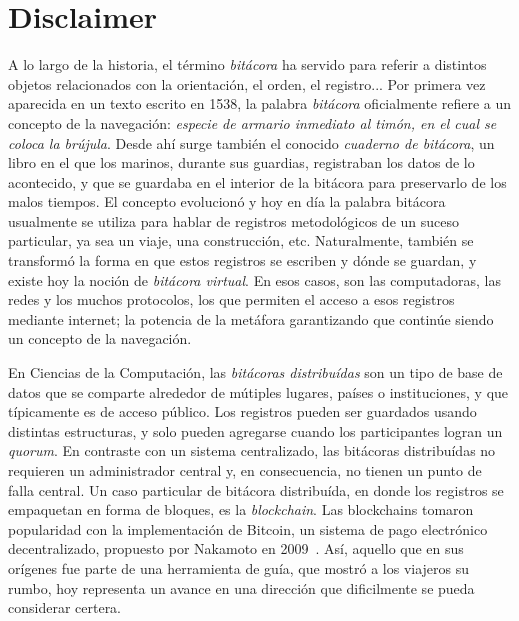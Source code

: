 \section{Disclaimer}


A lo largo de la historia, el término \textit{bitácora} ha servido para referir a
distintos objetos relacionados con la orientación, el orden, el registro... Por
primera vez aparecida en un texto escrito en 1538, la palabra \textit{bitácora}
oficialmente refiere a un concepto de la navegación: \textit{especie de armario
inmediato al timón, en el cual se coloca la brújula}. Desde ahí surge también
el conocido \textit{cuaderno de bitácora}, un libro en el que los marinos, durante
sus guardias, registraban los datos de lo acontecido, y que se guardaba en el
interior de la bitácora para preservarlo de los malos tiempos. El concepto
evolucionó y hoy en día la palabra bitácora usualmente se utiliza para hablar
de registros metodológicos de un suceso particular, ya sea un viaje, una
construcción, etc. Naturalmente, también se transformó la forma en que estos
registros se escriben y dónde se guardan, y existe hoy la noción de \textit{bitácora
virtual}. En esos casos, son las computadoras, las redes y los muchos protocolos,
los que permiten el acceso a esos registros mediante internet; la potencia de la
metáfora garantizando que continúe siendo un concepto de la navegación.
%

En Ciencias de la Computación, las \textit{bitácoras distribuídas} son un tipo de
base de datos que se comparte
alrededor de mútiples lugares, países o instituciones, y que típicamente es de
acceso público. Los registros pueden ser guardados usando distintas estructuras,
y solo pueden agregarse cuando los participantes logran un \textit{quorum}. En
contraste con un sistema centralizado, las bitácoras distribuídas no requieren
un administrador central y, en consecuencia, no tienen un punto de falla central.
Un caso particular de bitácora distribuída, en donde los registros se empaquetan
en forma de bloques, es la \textit{blockchain}. Las blockchains tomaron popularidad
con la implementación de Bitcoin, un sistema de pago electrónico decentralizado, 
propuesto por Nakamoto en 2009~\cite{nakamoto06bitcoin}.
Así, aquello que en sus orígenes fue parte de una herramienta de guía, que mostró
a los viajeros su rumbo, hoy representa un avance en una dirección que dificilmente se
pueda considerar certera.

